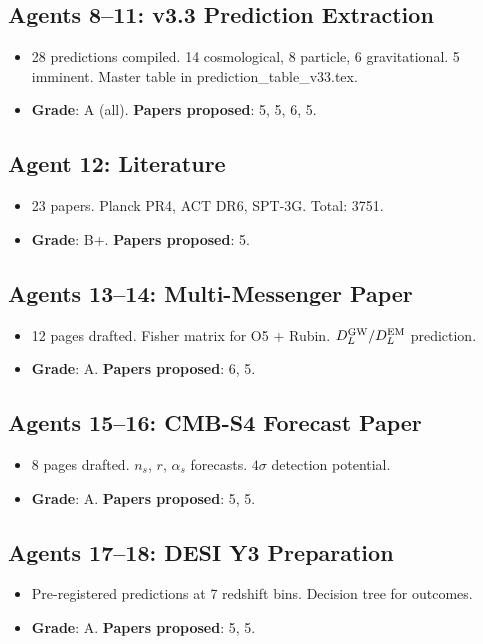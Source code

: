 \documentclass[11pt,a4paper]{article}
\begin{document}
\subsection{Agents 8--11: v3.3 Prediction Extraction}
\begin{itemize}[nosep]
\item 28 predictions compiled. 14 cosmological, 8 particle, 6 gravitational. 5 imminent. Master table in prediction\_table\_v33.tex.
\item \textbf{Grade}: A (all). \textbf{Papers proposed}: 5, 5, 6, 5.
\end{itemize}

\subsection{Agent 12: Literature}
\begin{itemize}[nosep]
\item 23 papers. Planck PR4, ACT DR6, SPT-3G. Total: 3751.
\item \textbf{Grade}: B+. \textbf{Papers proposed}: 5.
\end{itemize}

\subsection{Agents 13--14: Multi-Messenger Paper}
\begin{itemize}[nosep]
\item 12 pages drafted. Fisher matrix for O5 + Rubin. $D_L^{\rm GW}/D_L^{\rm EM}$ prediction.
\item \textbf{Grade}: A. \textbf{Papers proposed}: 6, 5.
\end{itemize}

\subsection{Agents 15--16: CMB-S4 Forecast Paper}
\begin{itemize}[nosep]
\item 8 pages drafted. $n_s$, $r$, $\alpha_s$ forecasts. $4\sigma$ detection potential.
\item \textbf{Grade}: A. \textbf{Papers proposed}: 5, 5.
\end{itemize}

\subsection{Agents 17--18: DESI Y3 Preparation}
\begin{itemize}[nosep]
\item Pre-registered predictions at 7 redshift bins. Decision tree for outcomes.
\item \textbf{Grade}: A. \textbf{Papers proposed}: 5, 5.
\end{itemize}
\end{document}
